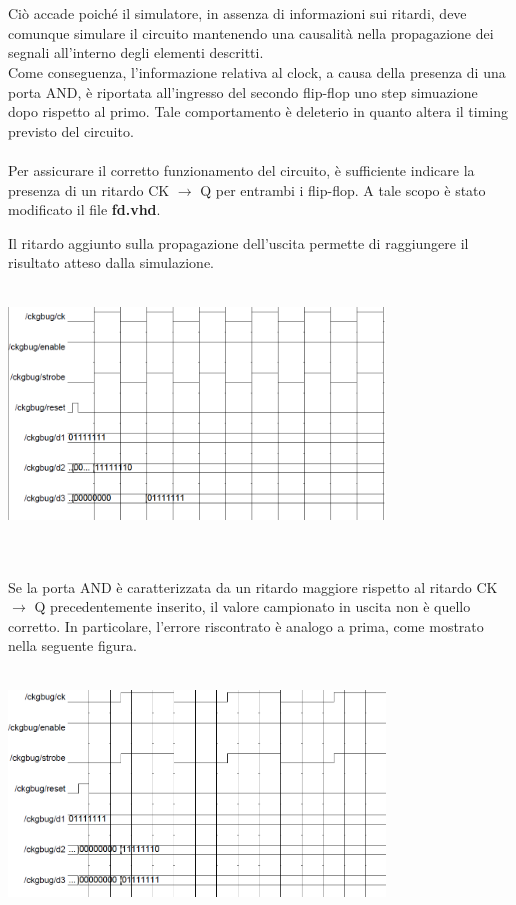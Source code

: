 \documentclass[11pt,  english, makeidx, a4paper, titlepage, oneside]{book}
\newenvironment{listato}{\footnotesize} {\normalsize }
\begin{document}
\\\\
Ciò accade poiché il simulatore, in assenza di informazioni sui ritardi, deve comunque simulare il circuito mantenendo una causalità nella propagazione dei segnali all'interno degli elementi descritti.
\\
Come conseguenza, l'informazione relativa al clock, a causa della presenza di una porta AND, è riportata all'ingresso del secondo flip-flop uno step simuazione dopo rispetto al primo. Tale comportamento è deleterio in quanto altera il timing previsto del circuito.
\\\\
Per assicurare il corretto funzionamento del circuito, è sufficiente indicare la presenza di un ritardo CK $\rightarrow$ Q per entrambi i flip-flop. A tale scopo è stato modificato il file \textbf{fd.vhd}.
\begin{center}
\begin{listato}
	\centerline{}
\end{listato}
\end{center}
Il ritardo aggiunto sulla propagazione dell'uscita permette di raggiungere il risultato atteso dalla simulazione.
\\\\
\centerline{\includegraphics[width=10cm]{./img/Lab_3/clk_bug_resolved.png}}
\\\\
Se la porta AND è caratterizzata da un ritardo maggiore rispetto al ritardo CK $\rightarrow$ Q precedentemente inserito, il valore campionato in uscita non è quello corretto. In particolare, l'errore riscontrato è analogo a prima, come mostrato nella seguente figura.
\\\\
\centerline{\includegraphics[width=10cm]{./img/Lab_3/clk_bug_delay.png}}
\newpage
\end{document}
